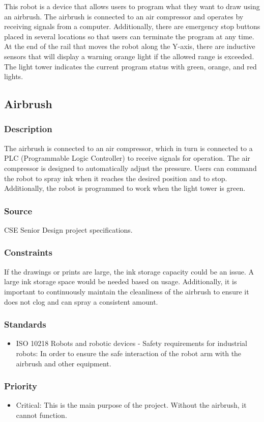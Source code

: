 This robot is a device that allows users to program what they want to draw using an airbrush. The airbrush is connected to an air compressor and operates by receiving signals from a computer. Additionally, there are emergency stop buttons placed in several locations so that users can terminate the program at any time. At the end of the rail that moves the robot along the Y-axis, there are inductive sensors that will display a warning orange light if the allowed range is exceeded. The light tower indicates the current program status with green, orange, and red lights.
\subsection{Airbrush}
\subsubsection{Description}
The airbrush is connected to an air compressor, which in turn is connected to a PLC (Programmable Logic Controller) to receive signals for operation. The air compressor is designed to automatically adjust the pressure. Users can command the robot to spray ink when it reaches the desired position and to stop. Additionally, the robot is programmed to work when the light tower is green.
\subsubsection{Source}
CSE Senior Design project specifications.
\subsubsection{Constraints}
If the drawings or prints are large, the ink storage capacity could be an issue. A large ink storage space would be needed based on usage. Additionally, it is important to continuously maintain the cleanliness of the airbrush to ensure it does not clog and can spray a consistent amount.
\subsubsection{Standards}
\begin{itemize}
\item ISO 10218 Robots and robotic devices - Safety requirements for industrial robots: In order to ensure the safe interaction of the robot arm with the airbrush and other equipment.
\end{itemize}
\subsubsection{Priority}
\begin{itemize}
\item Critical:
This is the main purpose of the project. Without the airbrush, it cannot function.
\end{itemize}
